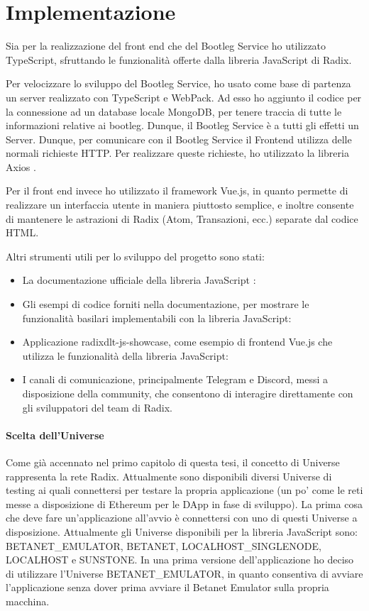 \chapter{Implementazione}
Sia per la realizzazione del front end che del Bootleg Service ho utilizzato TypeScript, sfruttando le funzionalità offerte dalla libreria JavaScript di Radix. 

Per velocizzare lo sviluppo del Bootleg Service, ho usato come base di partenza un server realizzato con TypeScript e WebPack. Ad esso ho aggiunto il codice per la connessione ad un database locale MongoDB, per tenere traccia di tutte le informazioni relative ai bootleg. Dunque, il Bootleg Service è a tutti gli effetti un Server. Dunque, per comunicare con il Bootleg Service il Frontend utilizza delle normali richieste HTTP. Per realizzare queste richieste, ho utilizzato la libreria Axios \cite{K25}.

Per il front end invece ho utilizzato il framework Vue.js, in quanto permette di realizzare un interfaccia utente in maniera piuttosto semplice, e inoltre consente di mantenere le astrazioni di Radix (Atom, Transazioni, ecc.) separate dal codice HTML.

Altri strumenti utili per lo sviluppo del progetto sono stati:
\begin{itemize}
    \item La documentazione ufficiale della libreria JavaScript \cite{K26}: 
    \item Gli esempi di codice forniti nella documentazione, per mostrare le funzionalità basilari implementabili con la libreria JavaScript: \cite{K27}
    \item Applicazione radixdlt-js-showcase, come esempio di frontend Vue.js che utilizza le funzionalità della libreria JavaScript: \cite{K28}
    \item I canali di comunicazione, principalmente Telegram e Discord, messi a disposizione della community, che consentono di interagire direttamente con gli sviluppatori del team di Radix.
\end{itemize}

\subsubsection{Scelta dell'Universe}

Come già accennato nel primo capitolo di questa tesi, il concetto di Universe rappresenta la rete Radix. Attualmente sono disponibili diversi Universe di testing ai quali connettersi per testare la propria applicazione (un po' come le reti messe a disposizione di Ethereum per le DApp in fase di sviluppo). La prima cosa che deve fare un'applicazione all'avvio è connettersi con uno di questi Universe a disposizione. Attualmente gli Universe disponibili per la libreria JavaScript sono: BETANET\_EMULATOR, BETANET, LOCALHOST\_SINGLENODE, LOCALHOST e SUNSTONE. In una prima versione dell'applicazione ho deciso di utilizzare l'Universe BETANET\_EMULATOR, in quanto consentiva di avviare l'applicazione senza dover prima avviare il Betanet Emulator sulla propria macchina. 

